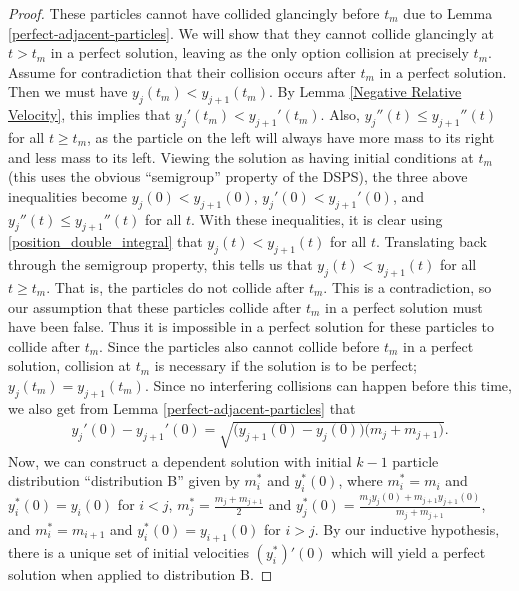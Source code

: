 \documentclass[11pt]{article}
\numberwithin{equation}{section}
\begin{document}
\begin{proof}
            These particles cannot have collided glancingly before $t_m$ due to Lemma \ref{perfect-adjacent-particles}. We will show that they cannot collide glancingly at $t > t_m$ in a perfect solution, leaving as the only option collision at precisely $t_m$. Assume for contradiction that their collision occurs after $t_m$ in a perfect solution. Then we must have $y_j(t_m) < y_{j+1}(t_m)$. By Lemma \ref{Negative Relative Velocity}, this implies that $y_j'(t_m) < y_{j+1}'(t_m)$. Also, $y_j''(t) \le y_{j+1}''(t)$ for all $t \ge t_m$, as the particle on the left will always have more mass to its right and less mass to its left. Viewing the solution as having initial conditions at $t_m$ (this uses the obvious ``semigroup'' property of the DSPS), the three above inequalities become $y_j(0) < y_{j+1}(0)$, $y_j'(0) < y_{j+1}'(0)$, and $y_j''(t) \le y_{j+1}''(t)$ for all $t$. With these inequalities, it is clear using \eqref{position_double_integral} that $y_j(t) < y_{j+1}(t)$ for all $t$. Translating back through the semigroup property, this tells us that $y_j(t) < y_{j+1}(t)$ for all $t \ge t_m$. That is, the particles do not collide after $t_m$. This is a contradiction, so our assumption that these particles collide after $t_m$ in a perfect solution must have been false. Thus it is impossible in a perfect solution for these particles to collide after $t_m$. Since the particles also cannot collide before $t_m$ in a perfect solution, collision at $t_m$ is necessary if the solution is to be perfect; $y_j(t_m)=y_{j+1}(t_m)$. Since no interfering collisions can happen before this time, we also get from Lemma \ref{perfect-adjacent-particles} that
            \begin{align}\label{Velocity Condition}
                y_j'(0)-y_{j+1}'(0)= \sqrt{\big(y_{j+1}(0)-y_j(0)\big)\big(m_j+m_{j+1}\big)}.
            \end{align} 
            Now, we can construct a dependent solution with initial $k-1$ particle distribution ``distribution B'' given by $m_i^*$ and $y_i^*(0)$, where $m_i^* = m_i$ and $y_i^*(0) = y_i(0)$ for $i<j$, $m_j^* = \frac{m_j+m_{j+1}}{2}$ and $y_j^*(0) = \frac{m_jy_j(0)+m_{j+1}y_{j+1}(0)}{m_j+m_{j+1}}$, and $m_i^* = m_{i+1}$ and $y_i^*(0) = y_{i+1}(0)$ for $i>j$. By our inductive hypothesis, there is a unique set of initial velocities $(y_i^*)'(0)$ which will yield a perfect solution when applied to distribution B. 


\end{proof}
\end{document}
